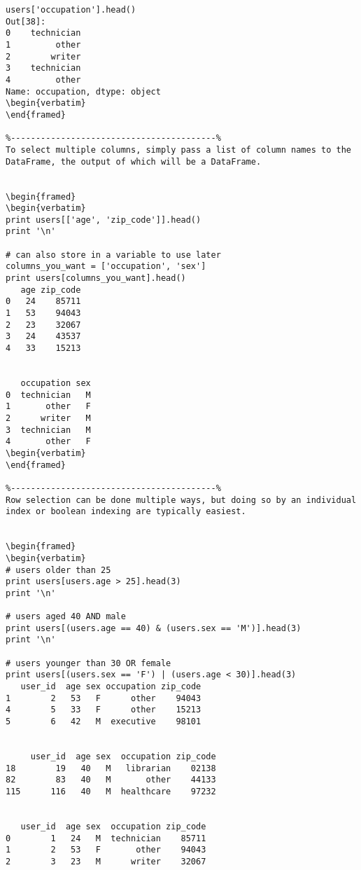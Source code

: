 \begin{framed}
\begin{verbatim}
users['occupation'].head()
Out[38]:
0    technician
1         other
2        writer
3    technician
4         other
Name: occupation, dtype: object
\begin{verbatim}
\end{framed}

%-----------------------------------------%
To select multiple columns, simply pass a list of column names to the DataFrame, the output of which will be a DataFrame.


\begin{framed}
\begin{verbatim}
print users[['age', 'zip_code']].head()
print '\n'

# can also store in a variable to use later
columns_you_want = ['occupation', 'sex'] 
print users[columns_you_want].head()
   age zip_code
0   24    85711
1   53    94043
2   23    32067
3   24    43537
4   33    15213


   occupation sex
0  technician   M
1       other   F
2      writer   M
3  technician   M
4       other   F
\begin{verbatim}
\end{framed}

%-----------------------------------------%
Row selection can be done multiple ways, but doing so by an individual index or boolean indexing are typically easiest.


\begin{framed}
\begin{verbatim}
# users older than 25
print users[users.age > 25].head(3)
print '\n'

# users aged 40 AND male
print users[(users.age == 40) & (users.sex == 'M')].head(3)
print '\n'

# users younger than 30 OR female
print users[(users.sex == 'F') | (users.age < 30)].head(3)
   user_id  age sex occupation zip_code
1        2   53   F      other    94043
4        5   33   F      other    15213
5        6   42   M  executive    98101


     user_id  age sex  occupation zip_code
18        19   40   M   librarian    02138
82        83   40   M       other    44133
115      116   40   M  healthcare    97232


   user_id  age sex  occupation zip_code
0        1   24   M  technician    85711
1        2   53   F       other    94043
2        3   23   M      writer    32067


\end{verbatim}
\end{framed}
